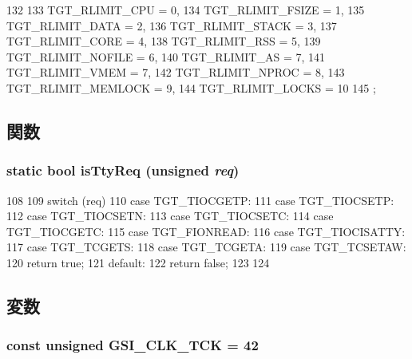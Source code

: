 \begin{DoxyCode}
132                           {
133         TGT_RLIMIT_CPU = 0,
134         TGT_RLIMIT_FSIZE = 1,
135         TGT_RLIMIT_DATA = 2,
136         TGT_RLIMIT_STACK = 3,
137         TGT_RLIMIT_CORE = 4,
138         TGT_RLIMIT_RSS = 5,
139         TGT_RLIMIT_NOFILE = 6,
140         TGT_RLIMIT_AS = 7,
141         TGT_RLIMIT_VMEM = 7,
142         TGT_RLIMIT_NPROC = 8,
143         TGT_RLIMIT_MEMLOCK = 9,
144         TGT_RLIMIT_LOCKS = 10
145     };
\end{DoxyCode}


\subsection{関数}
\hypertarget{classAlphaTru64_ab20bdd4422ecf6e1736a5587be296b3f}{
\subsubsection[{isTtyReq}]{\setlength{\rightskip}{0pt plus 5cm}static bool isTtyReq (unsigned {\em req})}}
\label{classAlphaTru64_ab20bdd4422ecf6e1736a5587be296b3f}



\begin{DoxyCode}
108     {
109         switch (req) {
110           case TGT_TIOCGETP:
111           case TGT_TIOCSETP:
112           case TGT_TIOCSETN:
113           case TGT_TIOCSETC:
114           case TGT_TIOCGETC:
115           case TGT_FIONREAD:
116           case TGT_TIOCISATTY:
117           case TGT_TCGETS:
118           case TGT_TCGETA:
119           case TGT_TCSETAW:
120             return true;
121           default:
122             return false;
123         }
124     }
\end{DoxyCode}


\subsection{変数}
\hypertarget{classAlphaTru64_a26c255cf18ca324c7c09a629e9e2a4f0}{
\subsubsection[{GSI\_\-CLK\_\-TCK}]{\setlength{\rightskip}{0pt plus 5cm}const unsigned {\bf GSI\_\-CLK\_\-TCK} = 42}}
\label{classAlphaTru64_a26c255cf18ca324c7c09a629e9e2a4f0}


